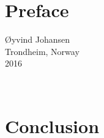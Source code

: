 \documentclass[12pt, a4paper, twoside, openright]{report}
\numberwithin{equation}{chapter}
\numberwithin{figure}{chapter}
\numberwithin{table}{chapter}
\begin{document}
\chapter*{Preface}

\begin{minipage}{0.95\textwidth}
\begin{flushright}
\O yvind Johansen \\
Trondheim, Norway \\ 
2016
\end{flushright}
\end{minipage}\\[4cm]

\newpage

\tableofcontents

\newpage

















\chapter{Conclusion}




\begin{appendices}


\end{appendices}
\end{document}
